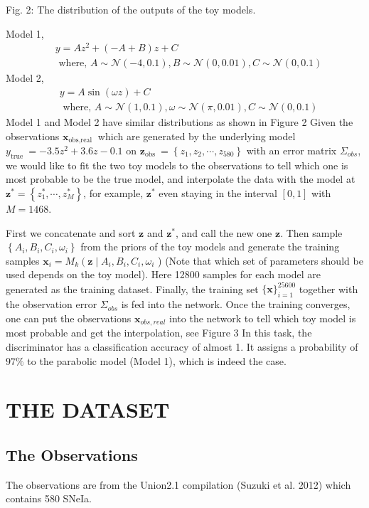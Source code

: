 \documentclass[10pt]{article}
\begin{document}
Fig. 2: The distribution of the outputs of the toy models.

Model 1,
$$
\begin{aligned}
&y=A z^{2}+(-A+B) z+C \\
&\text { where, } A \sim \mathcal{N}(-4,0.1), B \sim \mathcal{N}(0,0.01), C \sim \mathcal{N}(0,0.1)
\end{aligned}
$$
Model 2,
$$
\begin{aligned}
&y=A \sin (\omega z)+C \\
&\text { where, } A \sim \mathcal{N}(1,0.1), \omega \sim \mathcal{N}(\pi, 0.01), C \sim \mathcal{N}(0,0.1)
\end{aligned}
$$
Model 1 and Model 2 have similar distributions as shown in Figure 2 Given the observations $\boldsymbol{x}_{\text {obs,real }}$ which are generated by the underlying model $y_{\text {true }}=-3.5 z^{2}+3.6 z-0.1$ on $\boldsymbol{z}_{\text {obs }}=\left\{z_{1}, z_{2}, \cdots, z_{580}\right\}$ with an error matrix $\Sigma_{o b s}$, we would like to fit the two toy models to the observations to tell which one is most probable to be the true model, and interpolate the data with the model at $\boldsymbol{z}^{*}=\left\{z_{1}^{*}, \cdots, z_{M}^{*}\right\}$, for example, $\boldsymbol{z}^{*}$ even staying in the interval $[0,1]$ with $M=1468$.

First we concatenate and sort $\boldsymbol{z}$ and $\boldsymbol{z}^{*}$, and call the new one $\boldsymbol{z}$. Then sample $\left\{A_{i}, B_{i}, C_{i}, \omega_{i}\right\}$ from the priors of the toy models and generate the training samples $\boldsymbol{x}_{i}=M_{k}\left(\boldsymbol{z} \mid A_{i}, B_{i}, C_{i}, \omega_{i}\right.$ ) (Note that which set of parameters should be used depends on the toy model). Here 12800 samples for each model are generated as the training dataset. Finally, the training set $\{\boldsymbol{x}\}_{i=1}^{25600}$ together with the observation error $\Sigma_{o b s}$ is fed into the network. Once the training converges, one can put the observations $\boldsymbol{x}_{o b s, r e a l}$ into the network to tell which toy model is most probable and get the interpolation, see Figure 3 In this task, the discriminator has a classification accuracy of almost 1. It assigns a probability of $97 \%$ to the parabolic model (Model 1), which is indeed the case.

\section{THE DATASET}
\subsection{The Observations}
The observations are from the Union2.1 compilation (Suzuki et al. 2012) which contains 580 SNeIa.
\end{document}

